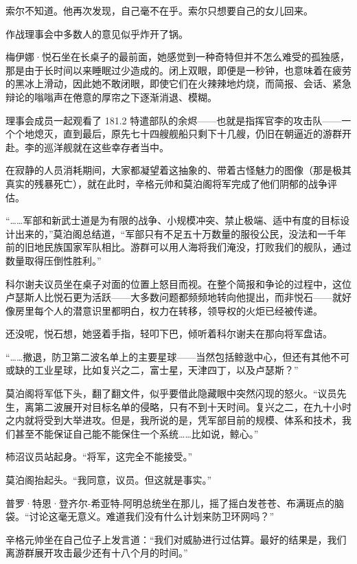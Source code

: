 \documentclass[AutoFakeBold=true]{book}
\begin{document}
索尔不知道。他再次发现，自己毫不在乎。索尔只想要自己的女儿回来。

\vspace*{1em}

作战理事会中多数人的意见似乎炸开了锅。

梅伊娜·悦石坐在长桌子的最前面，她感觉到一种奇特但并不怎么难受的孤独感，那是由于长时间以来睡眠过少造成的。闭上双眼，即便是一秒钟，也意味着在疲劳的黑冰上滑动，因此她不敢闭眼，即使它们在火辣辣地灼烧，而简报、会话、紧急辩论的嗡嗡声在倦意的厚帘之下逐渐消退、模糊。

理事会成员一起观看了 181.2 特遣部队的余烬——也就是指挥官李的攻击队——一个个地熄灭，直到最后，原先七十四艘舰船只剩下十几艘，仍旧在朝逼近的游群开赴。李的巡洋舰就在这些幸存者当中。

在寂静的人员消耗期间，大家都凝望着这抽象的、带着古怪魅力的图像（那是极其真实的残暴死亡），就在此时，辛格元帅和莫泊阁将军完成了他们阴郁的战争评估。

``……军部和新武士道是为有限的战争、小规模冲突、禁止极端、适中有度的目标设计出来的，''莫泊阁总结道，``军部只有不足五十万数量的服役公民，没法和一千年前的旧地民族国家军队相比。游群可以用人海将我们淹没，打败我们的舰队，通过数量取得压倒性胜利。''

科尔谢夫议员坐在桌子对面的位置上怒目而视。在整个简报和争论的过程中，这位卢瑟斯人比悦石更为活跃——大多数问题都频频地转向他提出，而非悦石——就好像房里每个人的潜意识里都明白，权力在转移，领导权的火炬已经被传递。

还没呢，悦石想，她竖着手指，轻叩下巴，倾听着科尔谢夫在那向将军盘诘。

``……撤退，防卫第二波名单上的主要星球——当然包括鲸逖中心，但还有其他不可或缺的工业星球，比如复兴之二，富士星，天津四丁，以及卢瑟斯？''

莫泊阁将军低下头，翻了翻文件，似乎要借此隐藏眼中突然闪现的怒火。``议员先生，离第二波展开对目标名单的侵略，只有不到十天时间。复兴之二，在九十小时之内就将受到大举进攻。但是，我所说的是，凭军部目前的规模、体系和技术，我们甚至不能保证自己能不能保住一个系统……比如说，鲸心。''

柿沼议员站起身。``将军，这完全不能接受。''

莫泊阁抬起头。``我同意，议员。但这就是事实。''

普罗·特恩·登齐尔-希亚特-阿明总统坐在那儿，摇了摇白发苍苍、布满斑点的脑袋。``讨论这毫无意义。难道我们没有什么计划来防卫环网吗？''

辛格元帅坐在自己位子上发言道：``我们对威胁进行过估算。最好的结果是，我们离游群展开攻击最少还有十八个月的时间。''
\end{document}
